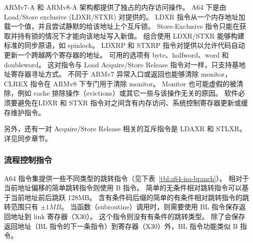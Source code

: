 ARMv7-A 和 ARMv8-A 架构都提供了独占的内存访问操作。
A64 下是由 Load/Store exclusive (LDXR/STXR) 对提供的。
LDXR 指令从一个内存地址加载一个值，并且尝试静默的给该地址上个互斥锁。
Store-Exclusive 指令只能在获取并持有锁的情况下才能向该地址写入新值。
组合使用 LDXR/STXR 能够构建标准的同步原语，如 spinlock。
LDXRP 和 STXRP 指令对提供以允许代码自动更新一个跨越两个寄存器的地址。
可用的选项有 byte、halfword、word 和 doubleword。
这对指令与 Load Acquire/Store Release 指令对一样，只支持基地址寄存器寻址方式。
不同于 ARMv7 异常入口或返回也能够清除 monitor，CLREX 指令在 ARMv8 下专门用于清除 monitor。
Monitor 也可能虚假的被清除，例如 cache 排除操作（evictions）或其它一些与该操作无关的原因。
软件必须要避免在LDXR 和 STXR 指令对之间含有内存访问、系统控制寄存器更新或缓存维护指令。

另外，还有一对 Acquire/Store Release 相关的互斥指令是 LDAXR 和 STLXR。
详见同步章节。

\subsubsection{流程控制指令}

A64 指令集提供一些不同类型的跳转指令（见下表~\ref{tbl:a64-isa-branch}）。
相对于当前地址偏移的简单跳转指令则使用 B 指令。
简单的无条件相对跳转指令可以基于当前地址前后跳跃 128MB。
含有条件码后缀的简单的有条件相对跳转指令的跳转范围只有 $\pm1MB$。
当函数（subroutine）调用时，则需要使用 BL 指令保存返回地址到 link 寄存器（X30）。
这个指令则没有有条件的跳转类型。
除了会保存返回地址（BL 指令的下一条指令）到寄存器（X30）外，BL 指令功能类似 B 指令。

